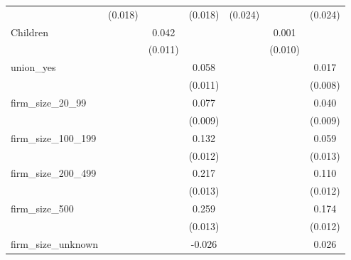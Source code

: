{\begin{tabular}{l*{6}{c}}
                    &     (0.018)         &                     &     (0.018)         &     (0.024)         &                     &     (0.024)         \\
Children            &                     &       0.042\sym{***}&                     &                     &       0.001         &                     \\
                    &                     &     (0.011)         &                     &                     &     (0.010)         &                     \\
union\_yes           &                     &                     &       0.058\sym{***}&                     &                     &       0.017\sym{**} \\
                    &                     &                     &     (0.011)         &                     &                     &     (0.008)         \\
firm\_size\_20\_99     &                     &                     &       0.077\sym{***}&                     &                     &       0.040\sym{***}\\
                    &                     &                     &     (0.009)         &                     &                     &     (0.009)         \\
firm\_size\_100\_199   &                     &                     &       0.132\sym{***}&                     &                     &       0.059\sym{***}\\
                    &                     &                     &     (0.012)         &                     &                     &     (0.013)         \\
firm\_size\_200\_499   &                     &                     &       0.217\sym{***}&                     &                     &       0.110\sym{***}\\
                    &                     &                     &     (0.013)         &                     &                     &     (0.012)         \\
firm\_size\_500       &                     &                     &       0.259\sym{***}&                     &                     &       0.174\sym{***}\\
                    &                     &                     &     (0.013)         &                     &                     &     (0.012)         \\
firm\_size\_unknown   &                     &                     &      -0.026         &                     &                     &       0.026         \\

\end{tabular}}
